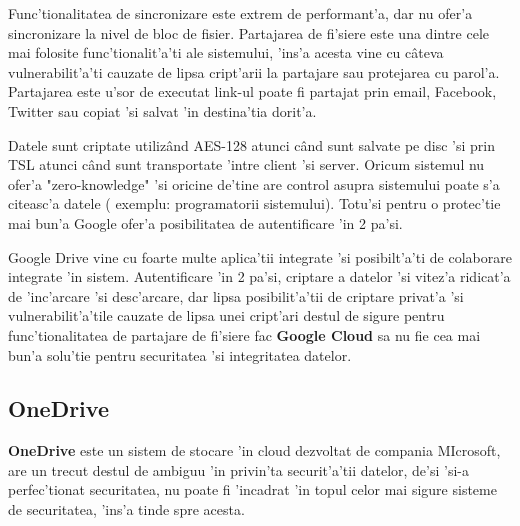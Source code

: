 \documentclass[12pt,a4paper,twoside]{report}
\begin{document}
Func'tionalitatea de sincronizare este extrem de performant'a, dar nu ofer'a sincronizare la nivel de bloc de fisier. Partajarea de fi'siere este una dintre cele mai folosite func'tionalit'a'ti ale sistemului, 'ins'a acesta vine cu câteva vulnerabilit'a'ti cauzate de lipsa cript'arii la partajare sau protejarea cu parol'a. Partajarea este u'sor de executat link-ul poate fi partajat prin email, Facebook, Twitter sau copiat 'si salvat 'in destina'tia dorit'a.

Datele sunt criptate utilizând AES-128 atunci când sunt salvate pe disc 'si prin TSL atunci când sunt transportate 'intre client 'si server. Oricum sistemul nu ofer'a "zero-knowledge" 'si oricine de'tine are control asupra sistemului poate s'a citeasc'a datele ( exemplu: programatorii sistemului).  
Totu'si pentru o protec'tie mai bun'a Google ofer'a posibilitatea de autentificare 'in 2 pa'si.


Google Drive vine cu foarte multe aplica'tii integrate 'si posibilt'a'ti de colaborare integrate 'in sistem. Autentificare 'in 2 pa'si, criptare a datelor  'si vitez'a ridicat'a de 'inc'arcare 'si desc'arcare, dar lipsa posibilit'a'tii de criptare privat'a 'si vulnerabilit'a'tile cauzate de lipsa unei cript'ari destul de sigure pentru func'tionalitatea de partajare de fi'siere fac \textbf{Google Cloud} sa nu fie cea mai bun'a solu'tie pentru securitatea 'si integritatea datelor.

\subsection{OneDrive}
 
\textbf{OneDrive} este un sistem de stocare 'in cloud dezvoltat de compania MIcrosoft, are un trecut destul de ambiguu 'in privin'ta securit'a'tii datelor, de'si 'si-a perfec'tionat securitatea, nu poate fi 'incadrat 'in topul celor mai sigure sisteme de securitatea\cite{top_secure}, 'ins'a tinde spre acesta.
\end{document}

